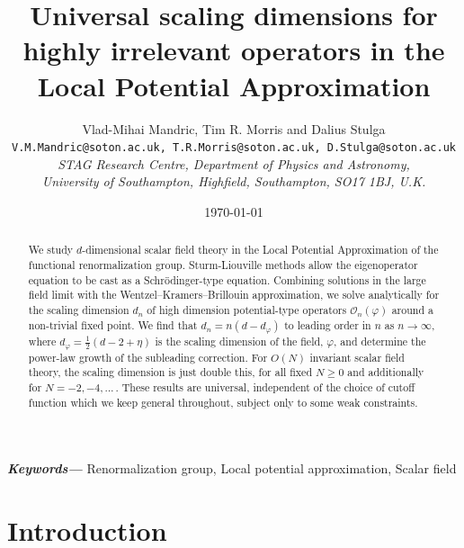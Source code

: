 \documentclass[11pt,a4paper]{article}
\title{Universal scaling dimensions for highly irrelevant operators in the Local Potential Approximation}
\author{Vlad-Mihai Mandric, Tim R. Morris and Dalius Stulga\\
\small \texttt{V.M.Mandric@soton.ac.uk, T.R.Morris@soton.ac.uk, D.Stulga@soton.ac.uk}\\
 \small \textit{STAG Research Centre, Department of Physics and Astronomy,}\\
  \small \textit{University of Southampton, Highfield, Southampton, SO17 1BJ, U.K.}
  }
\date{\today}
\numberwithin{figure}{section}
\numberwithin{equation}{section}
\newcommand{\ph}{\varphi}
\newcommand{\cO}{\mathcal{O}}
\providecommand{\keywords}[1]
{
  \small	
  \textbf{\textit{Keywords---}} #1
}
\begin{document}
\maketitle
\begin{abstract}

We study $d$-dimensional scalar field theory in the Local Potential Approximation of the functional renormalization group. Sturm-Liouville methods allow the eigenoperator equation to be cast as a Schr\"odinger-type equation. Combining solutions in the large field limit with the Wentzel–Kramers–Brillouin approximation, we solve analytically for the scaling dimension $d_n$ of high dimension potential-type operators $\cO_n(\ph)$ around a non-trivial fixed point. We find that $d_n = n(d-d_\ph)$ to leading order in $n$ as $n\to\infty$, where $d_\ph=\frac12(d-2+\eta)$ is the scaling dimension of the field, $\ph$, and determine the power-law growth of the subleading correction.
For $O(N)$ invariant scalar field theory, the scaling dimension is just double this, for all fixed $N\ge0$ and additionally for $N=-2,-4,\ldots \,.$ 
These results are universal, independent of the choice of cutoff function which we keep general throughout, subject only to some weak constraints.



\end{abstract}
\keywords{Renormalization group, Local potential approximation, Scalar field}
\newpage
\tableofcontents
\newpage


\section{Introduction}
\end{document}
